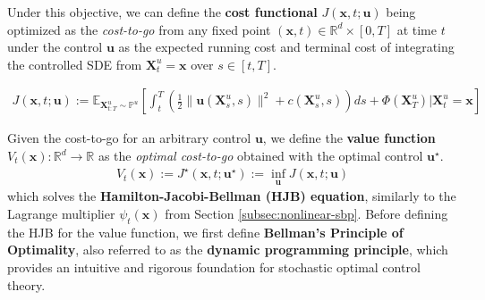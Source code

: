 \documentclass{article}
\newcommand{\boldtext}[1]{\textbf{\textcolor{MyGreen}{#1}}}
\begin{document}
Under this objective, we can define the \boldtext{cost functional} $J(\boldsymbol{x},t;\boldsymbol{u})$ being optimized as the \textit{cost-to-go} from any fixed point $(\boldsymbol{x}, t)\in \mathbb{R}^d\times [0,T]$ at time $t$ under the control $\boldsymbol{u}$ as the expected running cost and terminal cost of integrating the controlled SDE from $\boldsymbol{X}^u_t=\boldsymbol{x}$ over $s\in [t,T]$.
\begin{small}
\begin{align}
    J(\boldsymbol{x},t;\boldsymbol{u}):=\mathbb{E}_{\boldsymbol{X}^u_{t:T}\sim \mathbb{P}^u}\left[\int_t^T\left(\frac{1}{2}\|\boldsymbol{u}(\boldsymbol{X}^u_s,s)\|^2+c(\boldsymbol{X}^u_s,s)\right)ds+\Phi(\boldsymbol{X}^u_T)\bigg|\boldsymbol{X}^u_t=\boldsymbol{x}\right]\tag{Cost Functional}\label{eq:soc-cost-functional}
\end{align}
\end{small}
Given the cost-to-go for an arbitrary control $\boldsymbol{u}$, we define the \boldtext{value function} $V_t(\boldsymbol{x}):\mathbb{R}^d\to \mathbb{R}$ as the \textit{optimal cost-to-go} obtained with the optimal control $\boldsymbol{u}^\star$.
\begin{align}
    V_t(\boldsymbol{x}):=J^\star(\boldsymbol{x},t;\boldsymbol{u}^\star):=\inf_{\boldsymbol{u}}J(\boldsymbol{x},t; \boldsymbol{u})\tag{Value Function}\label{eq:soc-value-func}
\end{align}
which solves the \textbf{Hamilton-Jacobi-Bellman (HJB) equation}, similarly to the Lagrange multiplier $\psi_t(\boldsymbol{x})$ from Section \ref{subsec:nonlinear-sbp}. Before defining the HJB for the value function, we first define \boldtext{Bellman's Principle of Optimality}, also referred to as the \textbf{dynamic programming principle}, which provides an intuitive and rigorous foundation for stochastic optimal control theory. 
\end{document}
